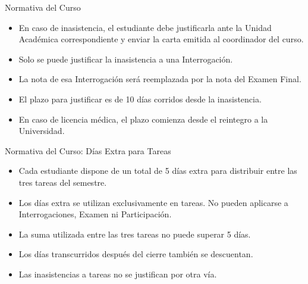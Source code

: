\documentclass{beamer}
\begin{document}
    \begin{frame}[label=normativa]{Normativa del Curso}
        
        \begin{itemize}
            \item En caso de inasistencia, el estudiante debe justificarla ante la
            Unidad Académica correspondiente y enviar la carta emitida al
            coordinador del curso.
            \item Solo se puede justificar la inasistencia a una Interrogación.
            \item La nota de esa Interrogación será reemplazada por la nota del Examen Final.
            \item El plazo para justificar es de 10 días corridos desde la inasistencia.
            \item En caso de licencia médica, el plazo comienza desde el reintegro
            a la Universidad.
        \end{itemize}
        
    \end{frame}

    \begin{frame}{Normativa del Curso: Días Extra para Tareas}
        
        \begin{itemize}
            \item Cada estudiante dispone de un total de 5 días extra para distribuir
            entre las tres tareas del semestre.
            \item Los días extra se utilizan exclusivamente en tareas. No pueden aplicarse a 
            Interrogaciones, Examen ni Participación.
            \item La suma utilizada entre las tres tareas no puede superar 5 días.
            \item Los días transcurridos después del cierre también se descuentan.
            \item Las inasistencias a tareas no se justifican por otra vía.
        \end{itemize}
        
    \end{frame}
\end{document}
